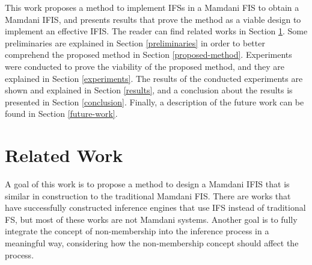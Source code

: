 \documentclass[conference]{IEEEtran}
\begin{document}
This work proposes a method to implement IFSs in a Mamdani FIS to
obtain a Mamdani IFIS, and presents results that prove the method as a
viable design to implement an effective IFIS. The reader can find
related works in Section \ref{related-work}. Some preliminaries are
explained in Section \ref{preliminaries} in order to better comprehend
the proposed method in Section \ref{proposed-method}. Experiments were
conducted to prove the viability of the proposed method, and they are
explained in Section \ref{experiments}. The results of the conducted
experiments are shown and explained in Section \ref{results}, and a
conclusion about the results is presented in Section
\ref{conclusion}. Finally, a description of the future work can be
found in Section \ref{future-work}.






\section{Related Work}
\label{related-work}

A goal of this work is to propose a method to design a Mamdani IFIS that is
similar in construction to the traditional Mamdani FIS. There are works
that have successfully constructed inference engines that use IFS
instead of traditional FS, but most of these works are not Mamdani
systems. Another goal is to fully integrate the concept of
non-membership into the inference process in a meaningful way,
considering how the non-membership concept should affect the process.
\end{document}
